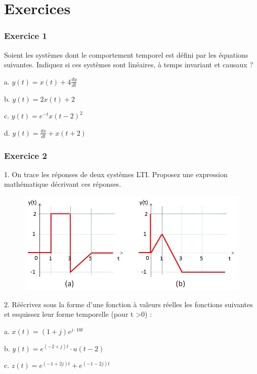 	\vspace{1\baselineskip}	

	
	
	\section{Exercices}
	
	\subsubsection{Exercice 1} 
	Soient les systèmes dont le comportement temporel est défini par les équations suivantes. Indiquez si ces systèmes sont linéaires, à temps invariant et causaux ?
	
	a. $y(t) = x(t)+4\frac{dy}{dt}$ 
	
	b. $y(t) = 2x(t)+2$ 
	
	c. $y(t)=e^{-t}x(t-2)^{2}$
	
	d. $y(t)=\frac{dx}{dt}+x(t+2)$
	
	\vspace{1\baselineskip}
	
	\subsubsection{Exercice 2} 
	1. On trace les réponses de deux systèmes LTI. Proposez une expression mathématique décrivant ces réponses.
	\begin{figure}[h!]
		\centering
		\includegraphics[scale=0.5]{images/Exo_2_2.jpg} 
	\end{figure} 

	
	2. Réécrivez sous la forme d'une fonction à valeurs réelles les fonctions suivantes et esquissez leur forme temporelle (pour t >0) :
	
	a. $x(t) = (1+j)e^{j\cdot 10t}$ 
	
	b. $y(t) = e^{(-2+j)t}\cdot u(t-2)$ 
	
	c. $z(t) = e^{(-1+2j)t}+e^{(-1-2j)t}$
	
